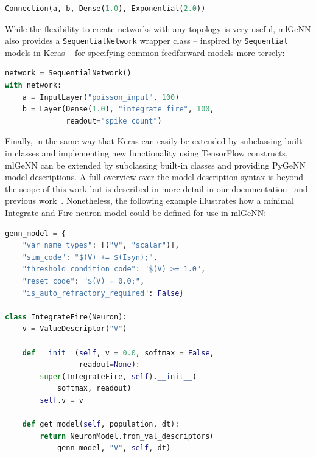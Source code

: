 \documentclass[sigconf]{acmart}
\begin{document}
\begin{lstlisting}[language=Python]
Connection(a, b, Dense(1.0), Exponential(2.0))
\end{lstlisting}

While the flexibility to create networks with any topology is very useful, mlGeNN also provides a \lstinline{SequentialNetwork} wrapper class -- inspired by \lstinline{Sequential} models in Keras -- for specifying common feedforward models more tersely:
\begin{lstlisting}[language=Python]
network = SequentialNetwork()
with network:
    a = InputLayer("poisson_input", 100)
    b = Layer(Dense(1.0), "integrate_fire", 100,
              readout="spike_count")
\end{lstlisting}
Finally, in the same way that Keras can easily be extended by subclassing built-in classes and implementing new functionality using TensorFlow constructs, mlGeNN can be extended by subclassing  built-in classes and providing PyGeNN model descriptions. 
A full overview over the model description syntax is beyond the scope of this work but is described in more detail in our documentation~\citep{mlgenn_docs} and previous work~\citep{Knight2021}.
Nonetheless, the following example illustrates how a minimal Integrate-and-Fire neuron model could be defined for use in mlGeNN:
\begin{lstlisting}[language=Python]
genn_model = {
    "var_name_types": [("V", "scalar")],
    "sim_code": "$(V) += $(Isyn);",
    "threshold_condition_code": "$(V) >= 1.0",
    "reset_code": "$(V) = 0.0;",
    "is_auto_refractory_required": False}

class IntegrateFire(Neuron):
    v = ValueDescriptor("V")

    def __init__(self, v = 0.0, softmax = False, 
                 readout=None):
        super(IntegrateFire, self).__init__(
            softmax, readout)
        self.v = v

    def get_model(self, population, dt):
        return NeuronModel.from_val_descriptors(
            genn_model, "V", self, dt)
\end{lstlisting}
\end{document}
